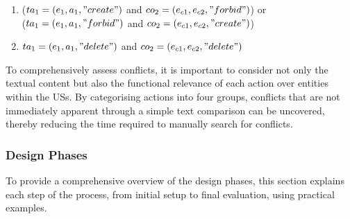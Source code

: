 \begin{definition}
\begin{enumerate}
\begin{enumerate}
			\item ($ta_1 = (e_1,a_1,"create")$ and $co_2 = (e_{c1},e_{c2},"forbid")$) or \\($ta_1 = (e_1,a_1,"forbid")$ and $co_2 = (e_{c1},e_{c2},"create")$)\\
			
			\item $ta_1 = (e_1,a_1,"delete")$ and $co_2 = (e_{c1},e_{c2},"delete")$
		\end{enumerate}
	\end{enumerate}
	 
	To comprehensively assess conflicts, it is important to consider not only the textual content but also the functional relevance of each action over entities within the USs. By categorising actions into four groups, conflicts that are not immediately apparent through a simple text comparison can be uncovered, thereby reducing the time required to manually search for conflicts.
\end{definition}	
\subsubsection*{Design Phases}\label{conflict_design_phases}
To provide a comprehensive overview of the design phases, this section explains each step of the process, from initial setup to final evaluation, using practical examples.

